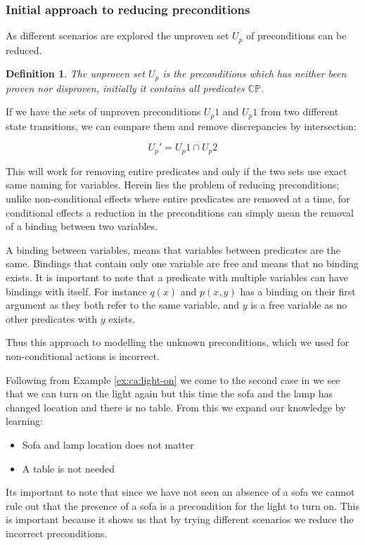 \documentclass[../Master.tex]{subfiles}
\begin{document}
\subsubsection{Initial approach to reducing preconditions}
As different scenarios are explored the unproven set $U_p$ of preconditions can be reduced.
\newtheorem{thm-unknown-set}{Definition}
\begin{thm-unknown-set}
The unproven set $U_p$ is the preconditions which has neither been proven nor disproven, initially it contains all  predicates $\mathbb{CP}$.
\end{thm-unknown-set}

If we have the sets of unproven preconditions $U_p1$ and $U_p1$ from two different state transitions, we can compare them and remove discrepancies by intersection:

%

\begin{equation}
\label{eq:unknownpredcondset}
	U_p' = U_p1 \cap U_p2
\end{equation}

This will work for removing entire predicates and only if the two sets use exact same naming for variables. Herein lies the problem of reducing preconditions; unlike non-conditional effects where entire predicates are removed at a time, for conditional effects a reduction in the preconditions can simply mean the removal of a binding between two variables.
\begin{definition}
	A binding between variables, means that variables between predicates are the same.
	Bindings that contain only one variable are free and means that no binding exists.
	It is important to note that a predicate with multiple variables can have bindings with itself.
	For instance $q(x)$ and $p(x,y)$ has a binding on their first argument as they both refer to the same variable, and $y$ is a free variable as no other predicates with $y$ exists.
\end{definition}
Thus this approach to modelling the unknown preconditions, which we used for non-conditional actions is incorrect.

\begin{example}\label{ex:ca:light-on-2}
Following from Example \ref{ex:ca:light-on} we come to the second case in 
we see that we can turn on the light again but this time the sofa and the lamp has changed location and
there is no table. From this we expand our knowledge by learning:
\begin{itemize}
	\item Sofa and lamp location does not matter
	\item A table is not needed
\end{itemize}
Its important to note that since we have not seen an absence of a sofa we cannot rule out that the presence of a sofa is a precondition for the light to turn on. This is important because it shows us that by trying different scenarios we reduce the incorrect preconditions.
\end{example}
\end{document}
